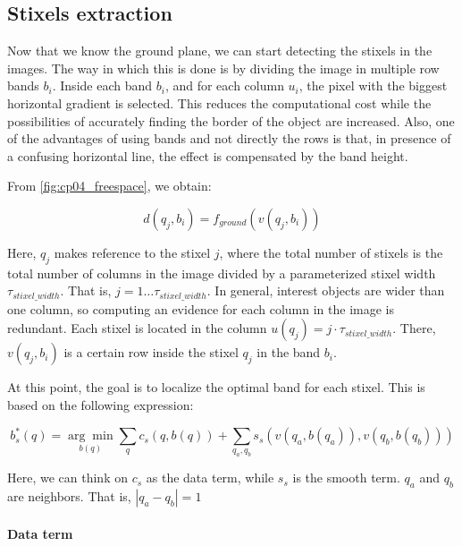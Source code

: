 \subsection{Stixels extraction}\label{ch:chapter04_01_02}

Now that we know the ground plane, we can start detecting the stixels in the images. The way in which this is done is by dividing the image in multiple row bands $b_i$. Inside each band $b_i$, and for each column $u_i$, the pixel with the biggest horizontal gradient is selected. This reduces the computational cost while the possibilities of accurately finding the border of the object are increased. Also, one of the advantages of using bands and not directly the rows is that, in presence of a confusing horizontal line, the effect is compensated by the band height.

From \ref{fig:cp04_freespace}, we obtain:

\begin{equation}\label{eq:cp04_ground_plane_function_by_band}
  d(q_j, b_i) = f_{ground}(v(q_j, b_i))
\end{equation}

Here, $q_j$ makes reference to the stixel $j$, where the total number of stixels is the total number of columns in the image divided by a parameterized stixel width $\tau_{stixel\_width}$. That is, $j=1 \dots \tau_{stixel\_width}$. In general, interest objects are wider than one column, so computing an evidence for each column in the image is redundant. Each stixel is located in the column $u(q_j) = j \cdot \tau_{stixel\_width}$. There, $v(q_j, b_i)$ is a certain row inside the stixel $q_j$ in the band $b_i$. 

At this point, the goal is to localize the optimal band for each stixel. This is based on the following expression:

\begin{equation}\label{eq:cp04_stixel_band_cost}
  b^*_s (q) = \underset{b(q)}{\arg\min} \underset{q}{\sum}c_s(q, b(q)) + \underset{q_a, q_b}{\sum}s_s(v(q_a, b(q_a)), v(q_b, b(q_b)))
\end{equation}

Here, we can think on $c_s$ as the data term, while $s_s$ is the smooth term. $q_a$ and $q_b$ are neighbors. That is, $|q_a - q_b| = 1$

\paragraph{Data term}\label{ch:chapter04_01_02_01}


